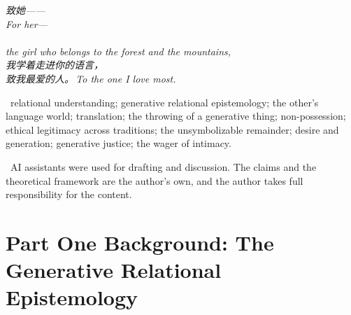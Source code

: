 
\thispagestyle{empty}
\null\vfill
\begin{center}
\begin{minipage}{0.74\linewidth}
\centering\itshape\color{rose}
{\cjk 致她——}\\[0.3em]
For her---\\[0.7em]
\\[0.2em]
the girl who belongs to the forest and the mountains,\\[0.5em]
{\cjk 我学着走进你的语言，}\\[0.2em]
{\upshape\footnotesize\color{gold} {\cjk 致我最爱的人。}\,\;To the one I love most.}
\end{minipage}
\end{center}
\vfill\null
\clearpage



\vspace{1.2em}
\, \textcolor{inksoft}{relational understanding; generative relational epistemology; the other's language world; translation; the throwing of a generative thing; non-possession; ethical legitimacy across traditions; the unsymbolizable remainder; desire and generation; generative justice; the wager of intimacy.}

\vspace{1.0em}
\, \textcolor{inksoft}{AI assistants were used for drafting and discussion. The claims and the theoretical framework are the author's own, and the author takes full responsibility for the content.}
\newpage

\newpage

\part*{\textcolor{rosedeep}{Part One \quad Background: The Generative Relational Epistemology}}

